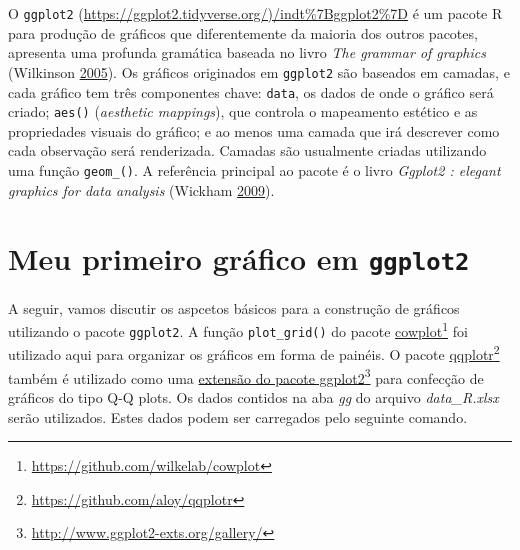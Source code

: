 \documentclass[
]{book}
\makeatletter
\newenvironment{Shaded}{\begin{snugshade}}{\end{snugshade}}
\newcommand{\CommentTok}[1]{\textcolor[rgb]{0.56,0.35,0.01}{\textit{#1}}}
\newcommand{\DataTypeTok}[1]{\textcolor[rgb]{0.13,0.29,0.53}{#1}}
\newcommand{\KeywordTok}[1]{\textcolor[rgb]{0.13,0.29,0.53}{\textbf{#1}}}
\newcommand{\NormalTok}[1]{#1}
\newcommand{\StringTok}[1]{\textcolor[rgb]{0.31,0.60,0.02}{#1}}
\numberwithin{equation}{section}
\newcommand{\indf}[1]{\index[function]{#1@\texttt{#1()}|ST}}
\newcommand{\indt}[1]{\index{#1|ST}}
\makeatother
\begin{document}
O \texttt{ggplot2} (\url{https://ggplot2.tidyverse.org/)/indt\%7Bggplot2\%7D} é um pacote R para produção de gráficos que diferentemente da maioria dos outros pacotes, apresenta uma profunda gramática baseada no livro \emph{The grammar of graphics} (Wilkinson \protect\hyperlink{ref-Wilkinson2005}{2005}). Os gráficos originados em \texttt{ggplot2} são baseados em camadas, e cada gráfico tem três componentes chave: \texttt{data}, os dados de onde o gráfico será criado; \texttt{aes()} (\emph{aesthetic mappings})\indf{aes}, que controla o mapeamento estético e as propriedades visuais do gráfico; e ao menos uma camada que irá descrever como cada observação será renderizada. Camadas são usualmente criadas utilizando uma função \texttt{geom\_()}.\indt{geom\_} A referência principal ao pacote é o livro \emph{Ggplot2 : elegant graphics for data analysis} (Wickham \protect\hyperlink{ref-Wickham2009}{2009}).

\hypertarget{meu-primeiro-gruxe1fico-em-ggplot2}{%
\section{\texorpdfstring{Meu primeiro gráfico em \texttt{ggplot2}}{Meu primeiro gráfico em ggplot2}}\label{meu-primeiro-gruxe1fico-em-ggplot2}}

A seguir, vamos discutir os aspcetos básicos para a construção de gráficos utilizando o pacote \texttt{ggplot2}. A função \texttt{plot\_grid()} \indf{plot\_grid}do pacote \href{https://github.com/wilkelab/cowplot}{cowplot}\footnote{\url{https://github.com/wilkelab/cowplot}} foi utilizado aqui para organizar os gráficos em forma de painéis. O pacote \href{https://github.com/aloy/qqplotr}{qqplotr}\footnote{\url{https://github.com/aloy/qqplotr}} também é utilizado como uma \href{http://www.ggplot2-exts.org/gallery/}{extensão do pacote ggplot2}\footnote{\url{http://www.ggplot2-exts.org/gallery/}} para confecção de gráficos do tipo Q-Q plots. Os dados contidos na aba \emph{gg} do arquivo \emph{data\_R.xlsx} serão utilizados. Estes dados podem ser carregados pelo seguinte comando.

\begin{Shaded}
\end{Shaded}
\end{document}
